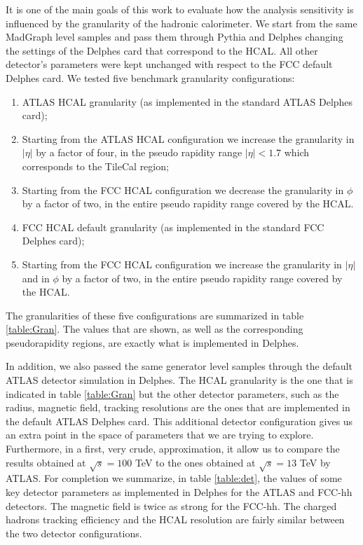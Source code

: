 It is one of the main goals of this work to evaluate how the analysis sensitivity is influenced by the granularity of the hadronic calorimeter. We start from the same MadGraph level samples and pass them through Pythia and Delphes changing the settings of the Delphes card that correspond to the HCAL. All other detector's parameters were kept unchanged with respect to the FCC default Delphes card. 
We tested five benchmark granularity configurations:

\begin{enumerate}
	\item ATLAS HCAL granularity (as implemented in the standard ATLAS Delphes card);
	\item Starting from the ATLAS HCAL configuration we increase the granularity in $|\eta|$ by a factor of four, in the pseudo rapidity range $|\eta|<1.7$ which corresponds to the TileCal region;
	\item Starting from the FCC HCAL configuration we decrease the granularity in $\phi$ by a factor of two, in the entire pseudo rapidity range covered by the HCAL.
	\item FCC HCAL default granularity (as implemented in the standard FCC Delphes card);
	\item Starting from the FCC HCAL configuration we increase the granularity in $|\eta|$ and in $\phi$ by a factor of two, in the entire pseudo rapidity range covered by the HCAL.
\end{enumerate}

The granularities of these five configurations are summarized in table \ref{table:Gran}. The values that are shown, as well as the corresponding pseudorapidity regions, are exactly what is implemented in Delphes. 

In addition, we also passed the same generator level samples through the default ATLAS detector simulation in Delphes. The HCAL granularity is the one that is indicated in table \ref{table:Gran} but the other detector parameters, such as the radius, magnetic field, tracking resolutions are the ones that are implemented in the default ATLAS Delphes card. This additional detector configuration gives us an extra point in the space of parameters that we are trying to explore. Furthermore, in a first, very crude, approximation, it allow us to compare the results obtained at $\sqrt{s}=100$ TeV to the ones obtained at $\sqrt{s}=13$ TeV by ATLAS.
For completion we summarize, in table \ref{table:det}, the values of some key detector parameters as implemented in Delphes for the ATLAS and FCC-hh detectors. The magnetic field is twice as strong for the FCC-hh. The charged hadrons tracking efficiency and the HCAL resolution are fairly similar between the two detector configurations.

